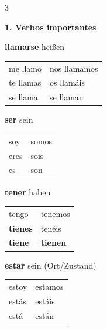 \documentclass[10pt, a4paper]{article}
\newcommand{\seriftext}[1]{{\fontfamily{ppl}\selectfont #1}}
\newcommand{\es}[1]{\seriftext{\textbf{#1}}}
\newcommand{\de}[1]{{\scriptsize\textcolor{mittelgrau}{#1}}}
\newcommand{\stamm}[1]{\textcolor{akzent}{#1}}
\newcommand{\abschnitt}[1]{\vspace{6pt}\noindent\textbf{\normalsize #1}\vspace{3pt}}
\begin{document}
\begin{multicols}{3}

\abschnitt{1. Verbos importantes}

\begin{grammatikbox}
{\small\textbf{llamarse} \de{heißen}}\\[2pt]
{\scriptsize
\begin{tabular}{@{}ll@{}}
me llamo & nos llamamos \\
te llamas & os llamáis \\
se llama & se llaman \\
\end{tabular}}
\end{grammatikbox}

\vspace{2pt}

\begin{grammatikbox}
{\small\textbf{ser} \de{sein}}\\[2pt]
{\scriptsize
\begin{tabular}{@{}ll@{}}
soy & somos \\
eres & sois \\
es & son \\
\end{tabular}}
\end{grammatikbox}

\vspace{2pt}

\begin{grammatikbox}
{\small\textbf{tener} \de{haben}}\\[2pt]
{\scriptsize
\begin{tabular}{@{}ll@{}}
tengo & tenemos \\
\es{t\stamm{ie}nes} & tenéis \\
\es{t\stamm{ie}ne} & \es{t\stamm{ie}nen} \\
\end{tabular}}
\end{grammatikbox}

\vspace{2pt}

\begin{grammatikbox}
{\small\textbf{estar} \de{sein (Ort/Zustand)}}\\[2pt]
{\scriptsize
\begin{tabular}{@{}ll@{}}
estoy & estamos \\
estás & estáis \\
está & están \\
\end{tabular}}
\end{grammatikbox}


\end{multicols}
\end{document}
